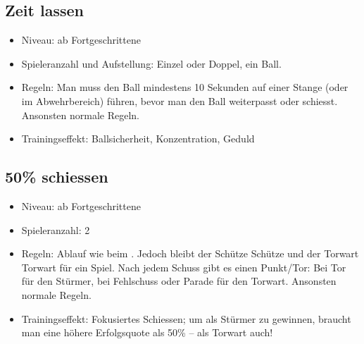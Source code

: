 \subsection{Zeit lassen}
\label{spielformen:sonderregeln:zeitlassen}

\begin{itemize}
\item Niveau: ab Fortgeschrittene
\item Spieleranzahl und Aufstellung: Einzel oder Doppel, ein Ball.
\item Regeln: 
Man muss den Ball mindestens 10 Sekunden auf einer Stange (oder im Abwehrbereich) führen, bevor man den Ball weiterpasst oder schiesst. 
Ansonsten normale Regeln.
\item Trainingseffekt: Ballsicherheit, Konzentration, Geduld 
\end{itemize}


\subsection{50\% schiessen}
\label{spielformen:sonderregeln:50schiessen}

\begin{itemize}
\item Niveau: ab Fortgeschrittene
\item Spieleranzahl: 2
\item Regeln: 
Ablauf wie beim . Jedoch bleibt der Schütze Schütze und der Torwart Torwart für ein Spiel. Nach jedem Schuss gibt es einen Punkt/Tor: Bei Tor für den Stürmer, bei Fehlschuss oder Parade für den Torwart.  
Ansonsten normale Regeln.
\item Trainingseffekt: Fokusiertes Schiessen; um als Stürmer zu gewinnen, braucht man eine höhere Erfolgsquote als 50\% -- als Torwart auch! 
\end{itemize}




